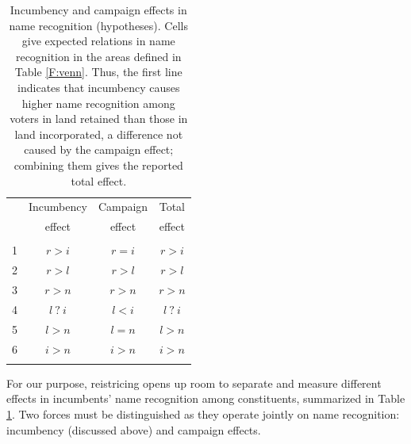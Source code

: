 \documentclass[letter,12pt]{article}
\begin{document}
\begin{table}
  \centering
  \begin{tabular}{cccc}
    & Incumbency & Campaign & Total   \\ [-.5ex]
    & effect     & effect   & effect  \\ \hline
    \\ [-1.2ex]
    1 & $r>i$    & $r=i$    & $r>i$   \\
    2 & $r>l$    & $r>l$    & $r>l$   \\
    3 & $r>n$    & $r>n$    & $r>n$   \\
    4 & $l~?~i$  & $l<i$    & $l~?~i$ \\
    5 & $l>n$    & $l=n$    & $l>n$   \\
    6 & $i>n$    & $i>n$    & $i>n$   \\ \\ [-1.2ex] \hline 
  \end{tabular}
  \caption{Incumbency and campaign effects in name recognition (hypotheses). Cells give expected relations in name recognition in the areas defined in Table \ref{F:venn}. Thus, the first line indicates that incumbency causes higher name recognition among voters in land retained than those in land incorporated, a difference not caused by the campaign effect; combining them gives the reported total effect.}\label{T:hyps}
\end{table}

For our purpose, reistricing opens up room to separate and measure different effects in incumbents' name recognition among constituents, summarized in Table \ref{T:hyps}. Two forces must be distinguished as they operate jointly on name recognition: incumbency (discussed above) and campaign effects.
\end{document}
